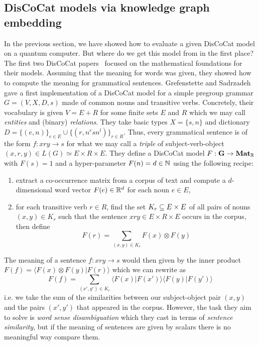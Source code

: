 
\subsection{DisCoCat models via knowledge graph embedding}

In the previous section, we have showed how to evaluate a given DisCoCat model on a quantum computer.
But where do we get this model from in the first place?
The first two DisCoCat papers~\cite{ClarkEtAl08,ClarkEtAl10} focused on the mathematical foundations for their models.
Assuming that the meaning for words was given, they showed how to compute the meaning for grammatical sentences.
Grefenstette and Sadrzadeh~\cite{GrefenstetteSadrzadeh11} gave a first implementation of a DisCoCat model for a simple pregroup grammar $G = (V, X, D, s)$ made of common nouns and transitive verbs.
Concretely, their vocabulary is given $V = E + R$ for some finite sets $E$ and $R$ which we may call \emph{entities} and (binary) \emph{relations}.
They take basic types $X = \{ s, n \}$ and dictionary $D = \{ (e, n) \}_{e \in E} \cup \{ (r, n^r s n^l) \}_{r \in R}$.
Thus, every grammatical sentence is of the form $f : x r y \to s$ for what we may call a \emph{triple} of subject-verb-object $(x, r, y) \in L(G) \simeq E \times R \times E$.
They define a DisCoCat model $F : \mathbf{G} \to \mathbf{Mat}_{\mathbb{R}}$ with $F(s) = 1$ and a hyper-parameter $F(n) = d \in \mathbb{N}$ using the following recipe:
\begin{enumerate}
\item extract a co-occurrence matrix from a corpus of text and compute a $d$-dimensional word vector $F(e) \in \mathbb{R}^d$ for each noun $e \in E$,
\item for each transitive verb $r \in R$, find the set $K_r \subseteq E \times E$ of all pairs of nouns $(x, y) \in K_r$ such that the sentence $x r y \in E \times R \times E$ occurs in the corpus, then define
$$F(r) = \sum_{(x, y) \in K_r} F(x) \otimes F(y)$$
\end{enumerate}
The meaning of a sentence $f : x r y \to s$ would then given by the inner product $F(f) = \langle F(x) \otimes F(y) \vert F(r) \rangle$ which we can rewrite as
$$F(f) = \sum_{(x', y') \in K_r} \langle F(x) \vert F(x') \rangle \langle F(y) \vert F(y') \rangle$$
i.e. we take the sum of the similarities between our subject-object pair $(x, y)$ and the pairs $(x', y')$ that appeared in the corpus.
However, the task they aim to solve is \emph{word sense disambiguation} which they cast in terms of \emph{sentence similarity}, but if the meaning of sentences are given by scalars there is no meaningful way compare them.
